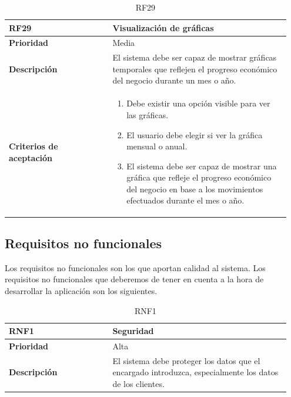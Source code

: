 \begin{table}[H]
	\centering %
	\begin{tabular}{|p{0.35\linewidth}|p{0.6\linewidth}|}
		\hline
		\rowcolor{grayshade} \textbf{RF29} & \textbf{Visualización de gráficas} \\
		\hline
		\textbf{Prioridad} & Media \\
		\hline
		\textbf{Descripción} & El sistema debe ser capaz de mostrar gráficas temporales que reflejen el progreso económico del negocio durante un mes o año.\\
		\hline
		\vspace{0.5mm}
		\textbf{Criterios de aceptación} & 
		\begin{minipage}[t]{0.9\linewidth}
			\begin{enumerate}
				\item Debe existir una opción visible para ver las gráficas.
				\item El usuario debe elegir si ver la gráfica mensual o anual. 
				\item El sistema debe ser capaz de mostrar una gráfica que refleje el progreso económico del negocio en base a los movimientos efectuados durante el mes o año.   
			\end{enumerate}
			\vspace{2mm}
		\end{minipage} \\
		\hline
	\end{tabular}
	\caption{RF29}
\end{table}


\newpage

\subsection{Requisitos no funcionales}

Los requisitos no funcionales son los que aportan calidad al sistema. Los requisitos no funcionales que deberemos de tener en cuenta a la hora de desarrollar la aplicación son los siguientes.

\begin{table}[H]
	\centering %
	\begin{tabular}{|p{0.35\linewidth}|p{0.6\linewidth}|}
		\hline
		\rowcolor{grayshade} \textbf{RNF1} & \textbf{Seguridad} \\
		\hline
		\textbf{Prioridad} & Alta \\
		\hline
		\textbf{Descripción} & El sistema debe proteger los datos que el encargado introduzca, especialmente los datos de los clientes.\\
		\hline
	\end{tabular}
	\caption{RNF1}
\end{table}

